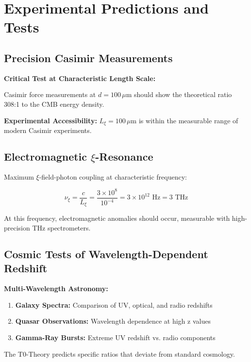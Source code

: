 \documentclass[12pt,a4paper]{article}
\newcommand{\Lxi}{L_\xi}
\begin{document}
	\section{Experimental Predictions and Tests}
	
	\subsection{Precision Casimir Measurements}
	
	\begin{experiment}
		\textbf{Critical Test at Characteristic Length Scale:}
		
		Casimir force measurements at $d = 100\,\mu$m should show the theoretical ratio 308:1 to the CMB energy density.
		
		\textbf{Experimental Accessibility:} $\Lxi = 100\,\mu$m is within the measurable range of modern Casimir experiments.
	\end{experiment}
	
	\subsection{Electromagnetic $\xi$-Resonance}
	
	Maximum $\xi$-field-photon coupling at characteristic frequency:
	
	\begin{equation}
		\nu_\xi = \frac{c}{\Lxi} = \frac{3 \times 10^8}{10^{-4}} = 3 \times 10^{12} \text{ Hz} = 3 \text{ THz}
	\end{equation}
	
	At this frequency, electromagnetic anomalies should occur, measurable with high-precision THz spectrometers.
	
	\subsection{Cosmic Tests of Wavelength-Dependent Redshift}
	
	\begin{experiment}
		\textbf{Multi-Wavelength Astronomy:}
		
		\begin{enumerate}
			\item \textbf{Galaxy Spectra:} Comparison of UV, optical, and radio redshifts
			\item \textbf{Quasar Observations:} Wavelength dependence at high z values
			\item \textbf{Gamma-Ray Bursts:} Extreme UV redshift vs. radio components
		\end{enumerate}
		
		The T0-Theory predicts specific ratios that deviate from standard cosmology.
	\end{experiment}
	
\end{document}
